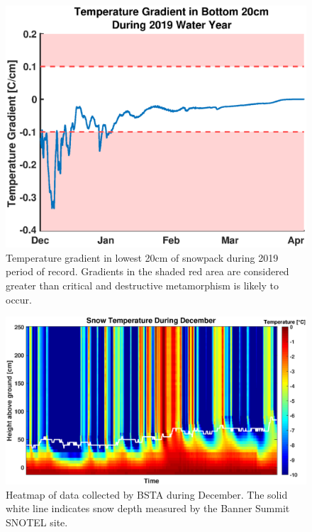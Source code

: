  \begin{figure}[H]
    \centering
    \includegraphics[width=0.65\linewidth]{figures/TempGrad/WY2019_L20_Grad.eps}
    \caption{Temperature gradient in lowest 20cm of snowpack during 2019 period of record. Gradients in the shaded red area are considered greater than critical and destructive metamorphism is likely to occur.}
    \label{fig:WY2019_L20_Grad}
 \end{figure}
 
\begin{figure}[H]
    \centering
    \includegraphics[width=0.95\linewidth]{figures/TempGrad/Dec_Heatmap.eps}
    \caption{Heatmap of data collected by BSTA during December. The solid white line indicates snow depth measured by the Banner Summit SNOTEL site.}
    \label{fig:Dec_U25_RDH}
 \end{figure}
 
